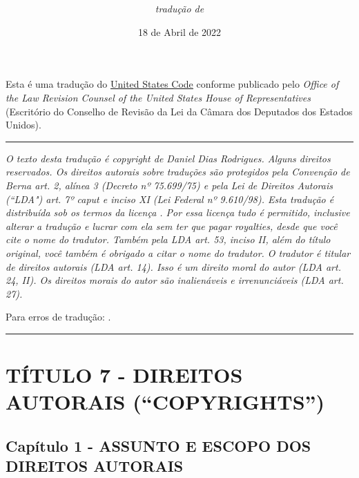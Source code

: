 \documentclass[a4paper, 12pt]{article}
\title{\textbf{\titulo}}
\author{\textit{tradução de}\\\autor}
\date{18 de Abril de 2022}
\begin{document}
\maketitle

Esta é uma tradução do \href{https://uscode.house.gov}{\underline{United States Code}} conforme publicado pelo \textit{Office of the Law Revision Counsel of the United States House of Representatives} (Escritório do Conselho de Revisão da Lei da Câmara dos Deputados dos Estados Unidos).

\begin{center}
\rule{7cm}{0.4pt}
\end{center}

\textit{O texto desta tradução é copyright  de Daniel Dias Rodrigues. Alguns direitos reservados. Os direitos autorais sobre traduções são protegidos pela Convenção de Berna art. 2, alínea 3 (Decreto nº 75.699/75) e pela Lei de Direitos Autorais (``LDA") art. 7º caput e inciso XI (Lei Federal nº 9.610/98). Esta tradução é distribuída sob os termos da licença \href{https://creativecommons.org/licenses/by/4.0/deed.pt_BR}{\underline{}}. Por essa licença tudo é permitido, inclusive alterar a tradução e lucrar com ela sem ter que pagar royalties, desde que você cite o nome do tradutor. Também pela LDA art. 53, inciso II, além do título original, você também é obrigado a citar o nome do tradutor. O tradutor é titular de direitos autorais (LDA art. 14). Isso é um direito moral do autor (LDA art. 24, II). Os direitos morais do autor são inalienáveis e irrenunciáveis (LDA art. 27).}

\vspace{5mm}

Para erros de tradução: \href{mailto:danieldiasr@gmail.com}{\underline{}}.

\begin{center}
\rule{7cm}{0.4pt}
\end{center}

\pagebreak

\tableofcontents

\pagebreak

\section{TÍTULO 7 - DIREITOS AUTORAIS (``COPYRIGHTS'')}

\subsection{Capítulo 1 - ASSUNTO E ESCOPO DOS DIREITOS AUTORAIS}
\end{document}
